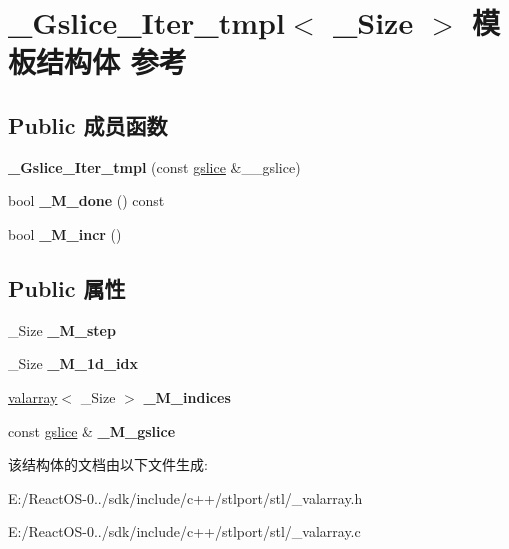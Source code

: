 \hypertarget{struct___gslice___iter__tmpl}{}\section{\+\_\+\+Gslice\+\_\+\+Iter\+\_\+tmpl$<$ \+\_\+\+Size $>$ 模板结构体 参考}
\label{struct___gslice___iter__tmpl}
\subsection*{Public 成员函数}
\begin{DoxyCompactItemize}
\item 
\mbox{\label{struct___gslice___iter__tmpl_ae7cb63eac13393b7ec6c8ce579e21e36}} 
{\bfseries \+\_\+\+Gslice\+\_\+\+Iter\+\_\+tmpl} (const \hyperlink{classgslice}{gslice} \&\+\_\+\+\_\+gslice)
\item 
\mbox{\label{struct___gslice___iter__tmpl_a2bd888d2baeaaff2665777c436e9baac}} 
bool {\bfseries \+\_\+\+M\+\_\+done} () const
\item 
\mbox{\label{struct___gslice___iter__tmpl_ada144a0c35c2bbecc3395890368f421e}} 
bool {\bfseries \+\_\+\+M\+\_\+incr} ()
\end{DoxyCompactItemize}
\subsection*{Public 属性}
\begin{DoxyCompactItemize}
\item 
\mbox{\label{struct___gslice___iter__tmpl_a00964b92cc20d7426140b556cc785127}} 
\+\_\+\+Size {\bfseries \+\_\+\+M\+\_\+step}
\item 
\mbox{\label{struct___gslice___iter__tmpl_ab00cfef123d3dbdc89d868d0faa447ad}} 
\+\_\+\+Size {\bfseries \+\_\+\+M\+\_\+1d\+\_\+idx}
\item 
\mbox{\label{struct___gslice___iter__tmpl_ac961146a95fff917a5a4ef4354781f31}} 
\hyperlink{classvalarray}{valarray}$<$ \+\_\+\+Size $>$ {\bfseries \+\_\+\+M\+\_\+indices}
\item 
\mbox{\label{struct___gslice___iter__tmpl_a797396cf46e2e31d3f9db320120d3de3}} 
const \hyperlink{classgslice}{gslice} \& {\bfseries \+\_\+\+M\+\_\+gslice}
\end{DoxyCompactItemize}


该结构体的文档由以下文件生成\+:\begin{DoxyCompactItemize}
\item 
E\+:/\+React\+O\+S-\/0../sdk/include/c++/stlport/stl/\+\_\+valarray.\+h\item 
E\+:/\+React\+O\+S-\/0../sdk/include/c++/stlport/stl/\+\_\+valarray.\+c\end{DoxyCompactItemize}
